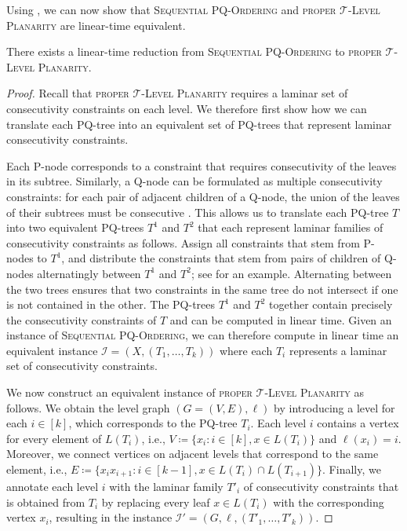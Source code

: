 \documentclass[runningheads]{llncs}
\newcommand{\pqprob}{\textsc{Sequential PQ-Or\-der\-ing}\xspace}
\newcommand{\tlp}{\textsc{proper $\mathcal T$-Level Planarity}\xspace}
\begin{document}
Using , we can now show that \pqprob and \tlp are linear-time equivalent.
\begin{lemma}\label{lem:pqprob2tlp}
  There exists a linear-time reduction from \pqprob to \tlp.
\end{lemma}
\begin{proof}
Recall that \tlp requires a laminar set of consecutivity constraints on each level.
  We therefore first show how we can translate each PQ-tree into an equivalent set of PQ-trees that represent laminar consecutivity constraints.
  
  Each P-node corresponds to a constraint that requires consecutivity of the leaves in its subtree.
  Similarly, a Q-node can be formulated as multiple consecutivity constraints:
  for each pair of adjacent children of a Q-node, the union of the leaves of their subtrees must be consecutive \cite{boo-pta-75}.
  This allows us to translate each PQ-tree $T$ into two equivalent PQ-trees $T^1$ and $T^2$ that each represent laminar families of consecutivity constraints as follows.
  Assign all constraints that stem from P-nodes to $T^1$, and distribute the constraints that stem from pairs of children of Q-nodes alternatingly between $T^1$ and $T^2$; see  for an example.
  Alternating between the two trees ensures that two constraints in the same tree do not intersect if one is not contained in the other.
  The PQ-trees $T^1$ and $T^2$ together contain precisely the consecutivity constraints of $T$ and can be computed in linear time. Given an instance of \pqprob, we can therefore compute in linear time an equivalent instance $\mathcal I = (X, (T_1, \dots, T_k))$ where each $T_i$ represents a laminar set of consecutivity constraints.
  
  We now construct an equivalent instance of \tlp as follows.
  We obtain the level graph $(G = (V, E), \ell)$ by introducing a level for each $i \in [k]$, which corresponds to the PQ-tree $T_i$.
  Each level $i$ contains a vertex for every element of $L(T_i)$, i.e., $V \coloneqq \{x_i : i \in [k], x \in L(T_i)\}$ and $\ell(x_i) = i$.
  Moreover, we connect vertices on adjacent levels that correspond to the same element, i.e., $E \coloneqq \{x_ix_{i+1} : i \in [k-1], x \in L(T_i) \cap L(T_{i+1}) \}$.
Finally, we annotate each level $i$ with the laminar family $T'_i$ of consecutivity constraints that is obtained from $T_i$ by replacing every leaf $x \in L(T_i)$ with the corresponding vertex $x_i$, resulting in the instance $\mathcal I' = (G, \ell, (T'_1, \dots, T'_k))$.
  

\end{proof}
\end{document}
